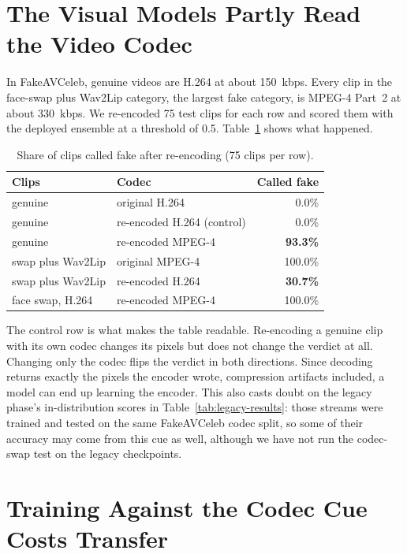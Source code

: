 \section{The Visual Models Partly Read the Video Codec}

In FakeAVCeleb, genuine videos are H.264 at about 150~kbps. Every clip in the
face-swap plus Wav2Lip category, the largest fake category, is MPEG-4 Part~2 at
about 330~kbps. We re-encoded 75 test clips for each row and scored them with
the deployed ensemble at a threshold of 0.5. Table~\ref{tab:codec} shows what
happened.

\begin{table}[ht]
    \centering
    \caption{Share of clips called fake after re-encoding (75 clips per row).}
    \label{tab:codec}
    \begin{tabular}{llr}
        \toprule
        \textbf{Clips} & \textbf{Codec} & \textbf{Called fake} \\
        \midrule
        genuine & original H.264 & 0.0\% \\
        genuine & re-encoded H.264 (control) & 0.0\% \\
        genuine & re-encoded MPEG-4 & \textbf{93.3\%} \\
        swap plus Wav2Lip & original MPEG-4 & 100.0\% \\
        swap plus Wav2Lip & re-encoded H.264 & \textbf{30.7\%} \\
        face swap, H.264 & re-encoded MPEG-4 & 100.0\% \\
        \bottomrule
    \end{tabular}
\end{table}

The control row is what makes the table readable. Re-encoding a genuine clip
with its own codec changes its pixels but does not change the verdict at all.
Changing only the codec flips the verdict in both directions. Since decoding
returns exactly the pixels the encoder wrote, compression artifacts included, a
model can end up learning the encoder. This also casts doubt on the legacy
phase's in-distribution scores in Table~\ref{tab:legacy-results}: those
streams were trained and tested on the same FakeAVCeleb codec split, so some of
their accuracy may come from this cue as well, although we have not run the
codec-swap test on the legacy checkpoints.

\section{Training Against the Codec Cue Costs Transfer}

